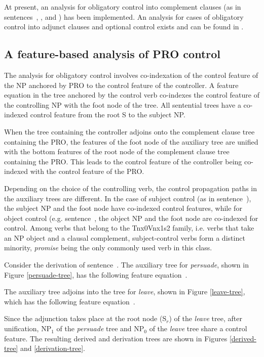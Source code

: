 At present, an analysis for obligatory control into complement clauses (as
in sentences~, , and ) has been implemented. An
analysis for cases of obligatory control into adjunct clauses and optional
control exists and can be found in \cite{bhatt94}.

\subsection{A feature-based analysis of PRO control}
The analysis for obligatory control involves co-indexation of the control
feature of the NP anchored by PRO to the control feature of the controller.
A feature equation in the tree anchored by the control verb co-indexes the
control feature of the controlling NP with the foot node of the tree.  All
sentential trees have a co-indexed control feature from the root S to the
subject NP.

When the tree containing the controller adjoins onto the complement clause
tree containing the PRO, the features of the foot node of the auxiliary
tree are unified with the bottom features of the root node of the
complement clause tree containing the PRO. This leads to the control
feature of the controller being co-indexed with the control feature of the
PRO.

Depending on the choice of the controlling verb, the control propagation
paths in the auxiliary trees are different.  In the case of subject control
(as in sentence~), the subject NP and the foot node have
co-indexed control features, while for object control
(e.g. sentence~, the object NP and the foot node are co-indexed
for control. Among verbs that belong to the Tnx0Vnx1s2 family, i.e. verbs
that take an NP object and a clausal complement, subject-control verbs form
a distinct minority, {\em promise} being the only commonly used verb in
this class.


Consider the derivation of sentence~. The auxiliary tree for
{\em persuade}, shown in Figure \ref{persuade-tree}, has the following
feature equation~.


The auxiliary tree adjoins into the tree for {\em leave}, shown in Figure
\ref{leave-tree}, which has the following feature equation~.


Since the adjunction takes place at the root node (S$_{r}$) of the {\em
leave} tree, after unification, NP$_{1}$ of the {\em persuade} tree and
NP$_{0}$ of the {\em leave} tree share a control feature. The resulting
derived and derivation trees are shown in Figures \ref{derived-tree} and
\ref{derivation-tree}.

